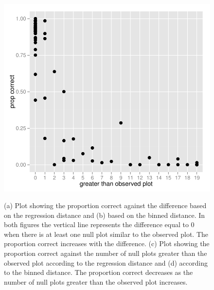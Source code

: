 \documentclass[12]{article}
\begin{document}
\begin{figure}[hbtp]
{\includegraphics[scale=0.55]{turk2-grtr-reg-prop.pdf}
\label{t2comp_1}
}
\label{turk2comp}
	\vspace{-.1in}
\caption[Optional caption for list of figures]{(a) Plot showing the proportion correct against the difference based on the regression distance and (b) based on the binned distance. In both figures the vertical line represents the difference equal to 0 when there is at least one null plot similar to the observed plot. The proportion correct increases with the difference. (c) Plot showing the proportion correct against the number of null plots greater than the observed plot according to the regression distance and (d) according to the binned distance. The proportion correct decreases as the number of null plots greater than the observed plot increases.}
\end{figure}
\end{document}
